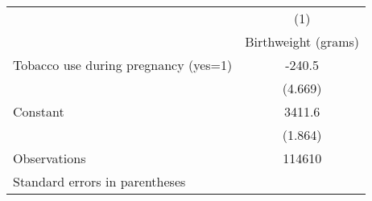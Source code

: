 \begin{tabular}{l*{1}{c}}
\hline\hline
                    &\multicolumn{1}{c}{(1)}\\
                    &\multicolumn{1}{c}{Birthweight (grams)}\\
\hline
Tobacco use during pregnancy (yes=1)&      -240.5\\
                    &     (4.669)\\
[1em]
Constant            &      3411.6\\
                    &     (1.864)\\
\hline
Observations        &      114610\\
\hline\hline
\multicolumn{2}{l}{\footnotesize Standard errors in parentheses}\\
\end{tabular}
